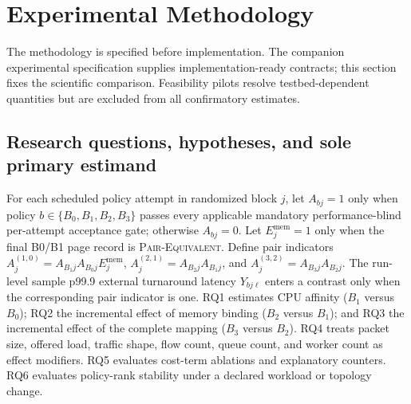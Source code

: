 \section{Experimental Methodology}
\label{sec:methodology}

The methodology is specified before implementation. The companion experimental specification supplies implementation-ready contracts; this section fixes the scientific comparison. Feasibility pilots resolve testbed-dependent quantities but are excluded from all confirmatory estimates.

\subsection{Research questions, hypotheses, and sole primary estimand}

For each scheduled policy attempt in randomized block $j$, let $A_{bj}=1$ only when policy $b\in\{B_0,B_1,B_2,B_3\}$ passes every applicable mandatory performance-blind per-attempt acceptance gate; otherwise $A_{bj}=0$. Let $E_j^{\mathrm{mem}}=1$ only when the final B0/B1 page record is \textsc{Pair-Equivalent}. Define pair indicators $A_j^{(1,0)}=A_{B_1j}A_{B_0j}E_j^{\mathrm{mem}}$, $A_j^{(2,1)}=A_{B_2j}A_{B_1j}$, and $A_j^{(3,2)}=A_{B_3j}A_{B_2j}$. The run-level sample p99.9 external turnaround latency $Y_{bj\ell}$ enters a contrast only when the corresponding pair indicator is one. RQ1 estimates CPU affinity ($B_1$ versus $B_0$); RQ2 the incremental effect of memory binding ($B_2$ versus $B_1$); and RQ3 the incremental effect of the complete mapping ($B_3$ versus $B_2$). RQ4 treats packet size, offered load, traffic shape, flow count, queue count, and worker count as effect modifiers. RQ5 evaluates cost-term ablations and explanatory counters. RQ6 evaluates policy-rank stability under a declared workload or topology change.

